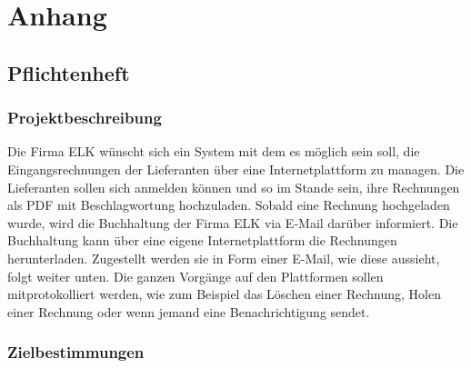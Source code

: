 \chapter{Anhang}
\section{Pflichtenheft}
\subsection{Projektbeschreibung}

Die Firma ELK wünscht sich ein System mit dem es möglich sein soll,
die Eingangsrechnungen der Lieferanten über eine Internetplattform
zu managen. Die Lieferanten sollen sich anmelden können und so im
Stande sein, ihre Rechnungen als PDF mit Beschlagwortung hochzuladen.
Sobald eine Rechnung hochgeladen wurde, wird die Buchhaltung der Firma
ELK via E-Mail darüber informiert. Die Buchhaltung kann über eine
eigene Internetplattform die Rechnungen herunterladen. Zugestellt
werden sie in Form einer E-Mail, wie diese aussieht, folgt weiter unten.
Die ganzen Vorgänge auf den Plattformen sollen mitprotokolliert werden,
wie zum Beispiel das Löschen einer Rechnung, Holen einer Rechnung oder wenn jemand
eine Benachrichtigung sendet.


\subsection{Zielbestimmungen}


